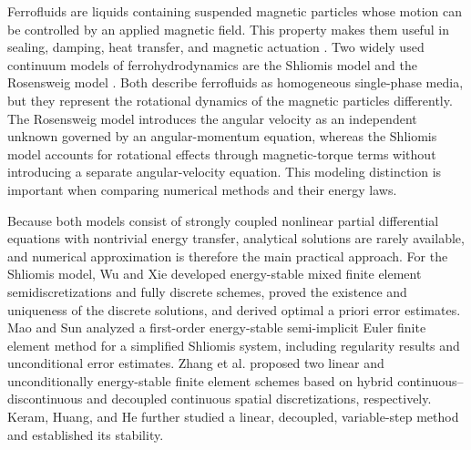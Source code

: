 \documentclass[11pt,a4paper]{article}
\theoremstyle{definition}
\numberwithin{equation}{section}
\begin{document}
Ferrofluids are liquids containing suspended magnetic particles whose
motion can be controlled by an applied magnetic field. This property
makes them useful in sealing, damping, heat transfer, and magnetic
actuation \cite{Rosensweig1985,Rosensweig1987}. Two widely used
continuum models of ferrohydrodynamics are the Shliomis model
\cite{Shliomis1972Effective,Shliomis2002Ferrofluids} and the
Rosensweig model \cite{Rosensweig1985,Rosensweig1987}. Both describe
ferrofluids as homogeneous single-phase media, but they represent the
rotational dynamics of the magnetic particles differently. The
Rosensweig model introduces the angular velocity as an independent
unknown governed by an angular-momentum equation, whereas the Shliomis
model accounts for rotational effects through magnetic-torque terms
without introducing a separate angular-velocity equation. This
modeling distinction is important when comparing numerical methods
and their energy laws.

Because both models consist of strongly coupled nonlinear partial differential equations with nontrivial energy transfer, analytical solutions are rarely available, and numerical approximation is therefore the main practical approach. For the Shliomis model, Wu and Xie \cite{WuXie2023a} developed energy-stable mixed finite element semidiscretizations and fully discrete schemes, proved the existence and uniqueness of the discrete solutions, and derived optimal a priori error estimates. Mao and Sun \cite{MaoSun2025} analyzed a first-order energy-stable semi-implicit Euler finite element method for a simplified Shliomis system, including regularity results and unconditional error estimates. Zhang et al.  \cite{ZhangPan2025} proposed two linear and unconditionally energy-stable finite element schemes based on hybrid continuous--discontinuous and decoupled continuous spatial discretizations, respectively. Keram, Huang, and He \cite{KeramFlow2026} further studied a linear, decoupled, variable-step method and established its stability.
\end{document}
